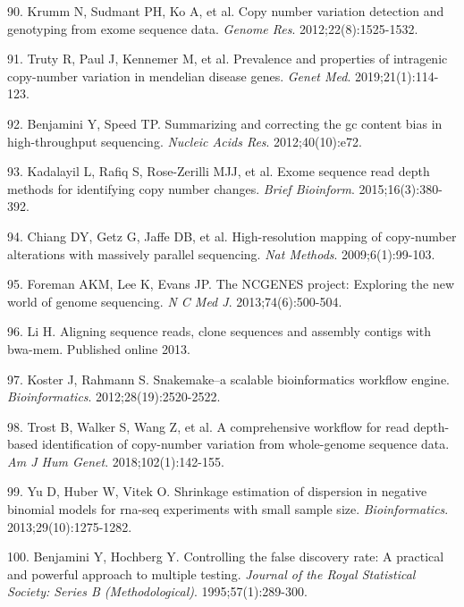 \documentclass[11pt,letterpaper]{book}
\begin{document}
\leavevmode\hypertarget{ref-krumm:2012aa}{}%
90. Krumm N, Sudmant PH, Ko A, et al. Copy number variation detection and genotyping from exome sequence data. \emph{Genome Res}. 2012;22(8):1525-1532.

\leavevmode\hypertarget{ref-truty:2019aa}{}%
91. Truty R, Paul J, Kennemer M, et al. Prevalence and properties of intragenic copy-number variation in mendelian disease genes. \emph{Genet Med}. 2019;21(1):114-123.

\leavevmode\hypertarget{ref-benjamini:2012aa}{}%
92. Benjamini Y, Speed TP. Summarizing and correcting the gc content bias in high-throughput sequencing. \emph{Nucleic Acids Res}. 2012;40(10):e72.

\leavevmode\hypertarget{ref-kadalayil:2015aa}{}%
93. Kadalayil L, Rafiq S, Rose-Zerilli MJJ, et al. Exome sequence read depth methods for identifying copy number changes. \emph{Brief Bioinform}. 2015;16(3):380-392.

\leavevmode\hypertarget{ref-chiang:2009aa}{}%
94. Chiang DY, Getz G, Jaffe DB, et al. High-resolution mapping of copy-number alterations with massively parallel sequencing. \emph{Nat Methods}. 2009;6(1):99-103.

\leavevmode\hypertarget{ref-foreman:2013aa}{}%
95. Foreman AKM, Lee K, Evans JP. The NCGENES project: Exploring the new world of genome sequencing. \emph{N C Med J}. 2013;74(6):500-504.

\leavevmode\hypertarget{ref-li:2013ab}{}%
96. Li H. Aligning sequence reads, clone sequences and assembly contigs with bwa-mem. Published online 2013.

\leavevmode\hypertarget{ref-koster:2012aa}{}%
97. Koster J, Rahmann S. Snakemake--a scalable bioinformatics workflow engine. \emph{Bioinformatics}. 2012;28(19):2520-2522.

\leavevmode\hypertarget{ref-trost:2018aa}{}%
98. Trost B, Walker S, Wang Z, et al. A comprehensive workflow for read depth-based identification of copy-number variation from whole-genome sequence data. \emph{Am J Hum Genet}. 2018;102(1):142-155.

\leavevmode\hypertarget{ref-yu:2013aa}{}%
99. Yu D, Huber W, Vitek O. Shrinkage estimation of dispersion in negative binomial models for rna-seq experiments with small sample size. \emph{Bioinformatics}. 2013;29(10):1275-1282.

\leavevmode\hypertarget{ref-benjamini:1995aa}{}%
100. Benjamini Y, Hochberg Y. Controlling the false discovery rate: A practical and powerful approach to multiple testing. \emph{Journal of the Royal Statistical Society: Series B (Methodological)}. 1995;57(1):289-300.
\end{document}

